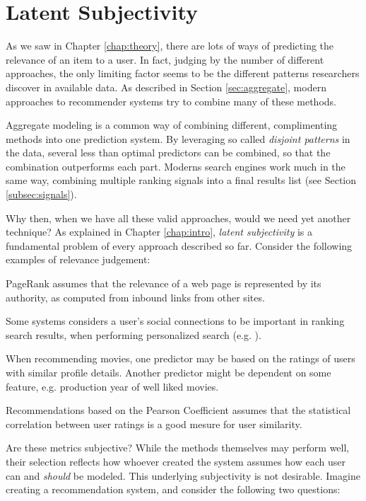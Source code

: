 \section{Latent Subjectivity}
\label{sec:reasoning}

As we saw in Chapter \ref{chap:theory}, 
there are lots of ways of predicting the
relevance of an item to a user. 
In fact, judging by the number of different approaches,
the only limiting factor seems to be the different 
patterns researchers discover in available data.
As described in Section \ref{sec:aggregate},
modern approaches to recommender systems try to combine many of these methods.

Aggregate modeling is a common way of combining different, complimenting
methods into one prediction system.
By leveraging so called \emph{disjoint patterns}
in the data, several less than optimal predictors
can be combined, so that the combination outperforms each part.
Moderns search engines work much in the same way,
combining multiple ranking signals into a final results list
(see Section \ref{subsec:signals}).

Why then, when we have all these valid approaches, would we need yet another technique?
As explained in Chapter \ref{chap:intro}, \emph{latent subjectivity}
is a fundamental problem of every approach described so far.
Consider the following examples of relevance judgement:

\begin{itemize*}
  \item PageRank \citep{Bender2005} assumes that the relevance of a web page is 
  represented by its authority, as computed from inbound links from other sites.
  \item Some systems considers a user's social connections to be important
  in ranking search results, when performing personalized search (e.g. \cite{Carmel2009}).
  \item When recommending movies, one predictor may be based on the ratings
  of users with similar profile details. Another predictor might be 
  dependent on some feature, e.g. production year of well liked movies.
  \item Recommendations based on the Pearson Coefficient \cite[p11]{Segaran2007}
  assumes that the statistical correlation between user ratings is a good
  mesure for user similarity.
\end{itemize*}

Are these metrics subjective? 
While the methods themselves may perform well, their selection
reflects how whoever created the system assumes how each user
can and \emph{should} be modeled. This underlying subjectivity is not desirable.
Imagine creating a recommendation system, and consider the following two questions:

